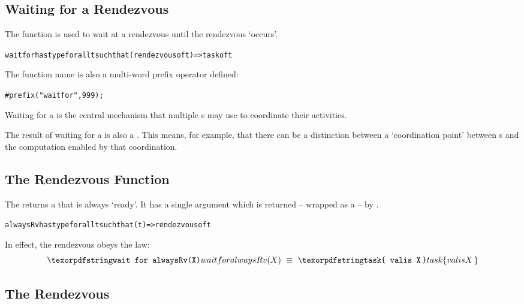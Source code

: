 \subsection{Waiting for a Rendezvous}
\label{waitfor}
The  function is used to wait at a rendezvous until the rendezvous `occurs'.

\begin{alltt}
wait for has type for all t such that (rendezvous of t)=>task of t
\end{alltt}

\begin{aside}
The  function name is also a multi-word prefix operator defined:
\begin{alltt}
\#prefix("wait for",999);
\end{alltt}
\end{aside}

Waiting for a  is the central mechanism that multiple s may use to coordinate their activities.

The result of waiting for a  is also a . This means, for example, that there can be a distinction between a `coordination point' between s and the computation enabled by that coordination.

\subsection{The  Rendezvous Function}
\label{alwaysRendezvous}

The  returns a  that is always `ready'. It has a single argument which is returned -- wrapped as a  -- by .

\begin{alltt}
alwaysRv has type for all t such that (t)=>rendezvous of t
\end{alltt}

In effect, the  rendezvous obeys the law:
\begin{equation*}
\q{wait for alwaysRv(X)}\ \equiv\ \q{task\{ valis X\,\}}
\end{equation*}

\subsection{The  Rendezvous}
\label{neverRendezvous}

